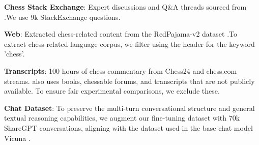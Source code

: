 \documentclass{article}
\theoremstyle{plain}
\theoremstyle{definition}
\theoremstyle{remark}
\begin{document}
\textbf{Chess Stack Exchange}: Expert discussions and Q\&A threads sourced from \cite{feng2024chessgpt}.We use 9k StackExchange questions.

\textbf{Web}: Extracted chess-related content from the RedPajama-v2 dataset \cite{weber2024redpajama} .To extract chess-related language corpus, we filter using the header for the keyword ’chess’.

\textbf{Transcripts}: 100 hours of chess commentary from Chess24 and chess.com streams. \cite{feng2024chessgpt} also uses books, chessable forums, and transcripts that are not publicly available. To ensure fair experimental comparisons, we exclude these.

\textbf{Chat Dataset}:
To preserve the multi-turn conversational structure and general textual reasoning capabilities, we augment our fine-tuning dataset with 70k ShareGPT conversations, aligning with the dataset used in the base chat model Vicuna \cite{zheng2023judging}.
\end{document}
